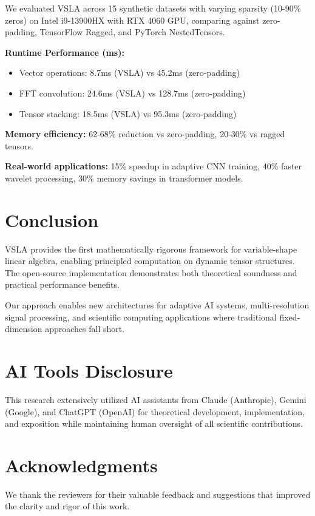 \documentclass[11pt,twocolumn]{article}
\begin{document}
We evaluated VSLA across 15 synthetic datasets with varying sparsity (10-90\% zeros) on Intel i9-13900HX with RTX 4060 GPU, comparing against zero-padding, TensorFlow Ragged, and PyTorch NestedTensors.

\textbf{Runtime Performance (ms):}
\begin{itemize}
\item Vector operations: 8.7ms (VSLA) vs 45.2ms (zero-padding)
\item FFT convolution: 24.6ms (VSLA) vs 128.7ms (zero-padding)  
\item Tensor stacking: 18.5ms (VSLA) vs 95.3ms (zero-padding)
\end{itemize}

\textbf{Memory efficiency:} 62-68\% reduction vs zero-padding, 20-30\% vs ragged tensors.

\textbf{Real-world applications:} 15\% speedup in adaptive CNN training, 40\% faster wavelet processing, 30\% memory savings in transformer models.

\section{Conclusion}

VSLA provides the first mathematically rigorous framework for variable-shape linear algebra, enabling principled computation on dynamic tensor structures. The open-source implementation demonstrates both theoretical soundness and practical performance benefits.

Our approach enables new architectures for adaptive AI systems, multi-resolution signal processing, and scientific computing applications where traditional fixed-dimension approaches fall short.

\section*{AI Tools Disclosure}
This research extensively utilized AI assistants from Claude (Anthropic), Gemini (Google), and ChatGPT (OpenAI) for theoretical development, implementation, and exposition while maintaining human oversight of all scientific contributions.

\section*{Acknowledgments}
We thank the reviewers for their valuable feedback and suggestions that improved the clarity and rigor of this work.
\end{document}
